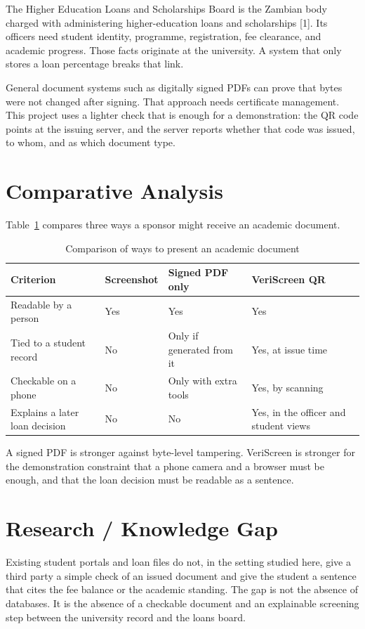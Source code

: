 \documentclass[12pt,a4paper]{report}
\begin{document}
The Higher Education Loans and Scholarships Board is the Zambian body charged with administering higher-education loans and scholarships [1]. Its officers need student identity, programme, registration, fee clearance, and academic progress. Those facts originate at the university. A system that only stores a loan percentage breaks that link.

General document systems such as digitally signed PDFs can prove that bytes were not changed after signing. That approach needs certificate management. This project uses a lighter check that is enough for a demonstration: the QR code points at the issuing server, and the server reports whether that code was issued, to whom, and as which document type.

\section{Comparative Analysis}
Table~\ref{tab:compare} compares three ways a sponsor might receive an academic document.

\begin{table}[H]
\centering
\caption{Comparison of ways to present an academic document}
\label{tab:compare}
\begin{tabular}{p{}p{}p{}p{}}
\toprule
Criterion & Screenshot & Signed PDF only & VeriScreen QR\\
\midrule
Readable by a person & Yes & Yes & Yes\\
Tied to a student record & No & Only if generated from it & Yes, at issue time\\
Checkable on a phone & No & Only with extra tools & Yes, by scanning\\
Explains a later loan decision & No & No & Yes, in the officer and student views\\
\bottomrule
\end{tabular}
\end{table}

A signed PDF is stronger against byte-level tampering. VeriScreen is stronger for the demonstration constraint that a phone camera and a browser must be enough, and that the loan decision must be readable as a sentence.

\section{Research / Knowledge Gap}
Existing student portals and loan files do not, in the setting studied here, give a third party a simple check of an issued document and give the student a sentence that cites the fee balance or the academic standing. The gap is not the absence of databases. It is the absence of a checkable document and an explainable screening step between the university record and the loans board.
\end{document}
